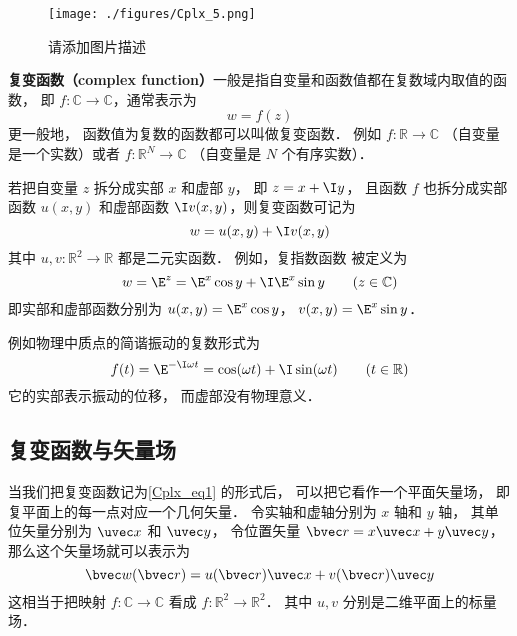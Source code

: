 
\begin{issues}
\issueTODO
\end{issues}
\begin{figure}[ht]
\centering
\texttt{[image: ./figures/Cplx\_5.png]}
\caption{请添加图片描述} \label{Cplx_fig5}
\end{figure}
\textbf{复变函数（complex function）}一般是指自变量和函数值都在复数域内取值的函数， 即 $f:\mathbb C \to \mathbb C$，通常表示为
\begin{equation}
w = f(z)
\end{equation}
更一般地， 函数值为复数的函数都可以叫做复变函数． 例如 $f: \mathbb R \to \mathbb C$ （自变量是一个实数）或者 $f:\mathbb R^N \to \mathbb C$ （自变量是 $N$ 个有序实数）．

若把自变量 $z$ 拆分成实部 $x$ 和虚部 $y$， 即 $z = x + \I y$， 且函数 $f$ 也拆分成实部函数 $u(x,y)$ 和虚部函数 $\I v(x,y)$，则复变函数可记为
\begin{equation}\label{Cplx_eq1}
w = u(x,y) + \I v(x,y)
\end{equation}
其中 $u, v: \mathbb R^2 \to \mathbb R$ 都是二元实函数． 例如，复指数函数 被定义为
\begin{equation}\label{Cplx_eq3}
w = \E^z = \E^x \cos y + \I \E^x\sin y \qquad (z \in \mathbb C)
\end{equation}
即实部和虚部函数分别为 $u(x, y) = \E^x \cos y$， $v(x, y) = \E^x \sin y$．

例如物理中质点的简谐振动的复数形式为
\begin{equation}
f(t) = \E^{-\I \omega t} = \cos(\omega t) + \I \sin(\omega t) \qquad (t \in \mathbb R)
\end{equation}
它的实部表示振动的位移， 而虚部没有物理意义．

\subsection{复变函数与矢量场}
当我们把复变函数记为\autoref{Cplx_eq1} 的形式后， 可以把它看作一个平面矢量场， 即复平面上的每一点对应一个几何矢量． 令实轴和虚轴分别为 $x$ 轴和 $y$ 轴， 其单位矢量分别为 $\uvec x$ 和 $\uvec y$， 令位置矢量 $\bvec r = x \uvec x + y \uvec y$， 那么这个矢量场就可以表示为
\begin{equation}\label{Cplx_eq4}
\bvec w(\bvec r) = u(\bvec r) \uvec x + v(\bvec r) \uvec y
\end{equation}
这相当于把映射 $f:\mathbb C \to \mathbb C$ 看成 $f: \mathbb R^2 \to \mathbb R^2$． 其中 $u, v$ 分别是二维平面上的标量场．

